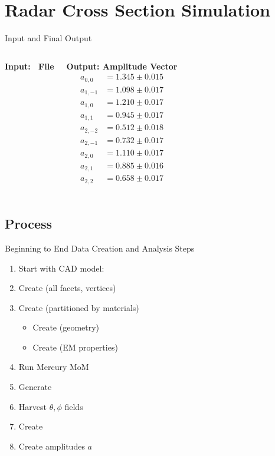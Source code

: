 % 

\section{Radar Cross Section Simulation}

\begin{frame}{Input and Final Output}
    \begin{columns}[T] %
        \textbf{Input: \obj \ File}
        \lstset{style=obj}

        \textbf{Output: Amplitude Vector}
        \[
        \begin{aligned}
        a_{0,0}  &= 1.345 \pm 0.015 \\
        a_{1,-1} &= 1.098 \pm 0.017 \\
        a_{1,0}  &= 1.210 \pm 0.017 \\
        a_{1,1}  &= 0.945 \pm 0.017 \\
        a_{2,-2} &= 0.512 \pm 0.018 \\
        a_{2,-1} &= 0.732 \pm 0.017 \\
        a_{2,0}  &= 1.110 \pm 0.017 \\
        a_{2,1}  &= 0.885 \pm 0.016 \\
        a_{2,2}  &= 0.658 \pm 0.017 \\
        \end{aligned}
        \]
    \end{columns}
\end{frame}


\subsection{Process}
\begin{frame}[ allowframebreaks ]{Beginning to End}
Data Creation and Analysis Steps
\begin{enumerate}
	\item Start with CAD model: \stl
	\item Create \obj (all facets, vertices)
	\item Create \bl{\facet} (partitioned by materials)
		\begin{itemize}
			\item Create  (geometry)
			\item Create  (EM properties)
		\end{itemize}
	\item Run Mercury MoM
	\item Generate 
	\item Harvest $\theta, \phi$ fields
	\item Create 
	\item Create amplitudes $a$
\end{enumerate}
\end{frame}

